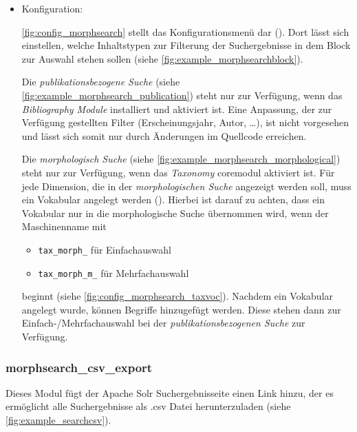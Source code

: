 \begin{itemize}[parsep=0pt, itemsep=5.0pt plus 2.0pt minus 1.0pt, leftmargin=*]
	\item Konfiguration:

	\cref{fig:config_morphsearch} stellt das Konfigurationsmenü dar (). Dort lässt sich einstellen, welche Inhaltstypen zur Filterung der Suchergebnisse in dem Block zur Auswahl stehen sollen (siehe \cref{fig:example_morphsearchblock}).

	Die \textit{publikationsbezogene Suche} (siehe \cref{fig:example_morphsearch_publication}) steht nur zur Verfügung, wenn das \textit{Bibliography Module} installiert und aktiviert ist. Eine Anpassung, der zur Verfügung gestellten Filter (Erscheinungsjahr, Autor, \dots), ist nicht vorgesehen und lässt sich somit nur durch Änderungen im Quellcode erreichen.

	Die \textit{morphologisch Suche} (siehe \cref{fig:example_morphsearch_morphological}) steht nur zur Verfügung, wenn das \textit{Taxonomy} \gls{coremodul} aktiviert ist. Für jede Dimension, die in der \textit{morphologischen Suche} angezeigt werden soll, muss ein Vokabular angelegt werden (). Hierbei ist darauf zu achten, dass ein Vokabular nur in die morphologische Suche übernommen wird, wenn der Maschinenname mit
	\begin{itemize}
		\item \lstinline|tax_morph_| für Einfachauswahl
		\item \lstinline|tax_morph_m_| für Mehrfachauswahl
	\end{itemize}
	beginnt (siehe \cref{fig:config_morphsearch_taxvoc}). Nachdem ein Vokabular angelegt wurde, können Begriffe hinzugefügt werden. Diese stehen dann zur Einfach-/Mehrfachauswahl bei der \textit{publikationsbezogenen Suche} zur Verfügung.

\end{itemize}


\subsubsection{morphsearch\_csv\_export}\label{subsub:morphsearchcsv}

Dieses Modul fügt der Apache Solr Suchergebnisseite einen Link hinzu, der es ermöglicht alle Suchergebnisse als .csv Datei herunterzuladen (siehe \cref{fig:example_searchcsv}).

